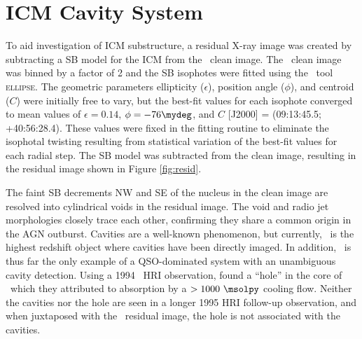 \documentclass[useAMS,usenatbib]{mn2e}
\begin{document}
\section{ICM Cavity System}
\label{sec:cavs}

To aid investigation of ICM substructure, a residual X-ray image was
created by subtracting a SB model for the ICM from the \cxo\ clean
image. The \cxo\ clean image was binned by a factor of 2 and the
SB isophotes were fitted using the \iraf\ tool \textsc{ellipse}. The
geometric parameters ellipticity ($\epsilon$), position angle
($\phi$), and centroid ($C$) were initially free to vary, but the
best-fit values for each isophote converged to mean values of
$\epsilon = 0.14$, $\phi = -76\mydeg$, and $C$ [J2000] = (09:13:45.5;
+40:56:28.4). These values were fixed in the fitting routine to
eliminate the isophotal twisting resulting from statistical variation
of the best-fit values for each radial step. The SB model was
subtracted from the clean image, resulting in the residual image shown
in Figure \ref{fig:resid}.

The faint SB decrements NW and SE of the nucleus in the clean image
are resolved into cylindrical voids in the residual image. The void
and radio jet morphologies closely trace each other, confirming they
share a common origin in the AGN outburst. Cavities are a well-known
phenomenon, but currently, \irs\ is the highest redshift object where
cavities have been directly imaged. In addition, \irs\ is thus far the
only example of a QSO-dominated system with an unambiguous cavity
detection. Using a 1994 \rosat\ HRI observation,
\citet{1995MNRAS.274L..63F} found a ``hole'' in the core of
\rxj\ which they attributed to absorption by a $> 1000 ~\msolpy$
cooling flow. Neither the cavities nor the hole are seen in a longer
1995 HRI follow-up observation, and when juxtaposed with the
\cxo\ residual image, the hole is not associated with the
cavities.
\end{document}

